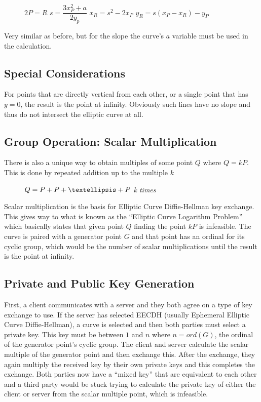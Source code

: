 \documentclass[conference]{IEEEtran}
\begin{document}
\begin{figure}[h]
	\begin{center}
		$2P = R$ \newline
		$s = \dfrac{3x_P^2 + a}{2y_p}$ \newline
		$x_R = s^2 - 2x_P$ \newline
		$y_R = s(x_P - x_R) - y_P$ \newline
	\end{center}
\end{figure}

Very similar as before, but for the slope the curve's $a$ variable must be used in the calculation.

\subsection{Special Considerations}
For points that are directly vertical from each other, or a single point that has $y = 0$, the result is the point at infinity. Obviously such lines have no slope and thus do not intersect the elliptic curve at all.

\subsection{Group Operation: Scalar Multiplication}
There is also a unique way to obtain multiples of some point $Q$ where $Q = kP$. This is done by repeated addition up to the multiple $k$

\begin{figure}[h]
	\begin{center}
		$Q = P + P + \textellipsis + P$ \textit{k times}
	\end{center}
\end{figure}

Scalar multiplication is the basis for Elliptic Curve Diffie-Hellman key exchange. This gives way to what is known as the ``Elliptic Curve Logarithm Problem'' which basically states that given point $Q$ finding the point $kP$ is infeasible. The curve is paired with a generator point $G$ and that point has an ordinal for its cyclic group, which would be the number of scalar multiplications until the result is the point at infinity.

\subsection{Private and Public Key Generation}
First, a client communicates with a server and they both agree on a type of key exchange to use. If the server has selected EECDH (usually Ephemeral Elliptic Curve Diffie-Hellman), a curve is selected and then both parties must select a private key. This key must be between $1$ and $n$ where $n = ord(G)$, the ordinal of the generator point's cyclic group. The client and server calculate the scalar multiple of the generator point and then exchange this. After the exchange, they again multiply the received key by their own private keys and this completes the exchange. Both parties now have a ``mixed key'' that are equivalent to each other and a third party would be stuck trying to calculate the private key of either the client or server from the scalar multiple point, which is infeasible.
\end{document}
